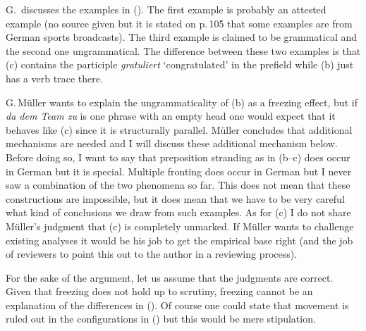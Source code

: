 \begin{exe}
\begin{xlist}
G.\,\citet{GMueller2018a} discusses the examples in (). The first example is probably an
attested example (no source given but it is stated on p.\,105 that some examples are from German sports
broadcasts). The third example is claimed to be grammatical and the second one ungrammatical. The
difference between these two examples is that (c) contains the participle \emph{gratuliert}
`congratulated' in the prefield while (b) just has a verb trace there.

\eal
{}
\zl
G.\,Müller wants to explain the ungrammaticality of (b) as a freezing effect, but if \emph{da dem
  Team zu} is one phrase with an empty head one would expect that it behaves like (c) since
it is structurally parallel. Müller concludes that additional mechanisms are needed and I will
discuss these additional mechanism below. Before doing so, I want to say that preposition stranding
as in (b--c) does occur in German but it is special. Multiple fronting does occur in German
but I never saw a combination of the two phenomena so far. This does not mean that these
constructions are impossible, but it does mean that we have to be very careful what kind of
conclusions we draw from such examples. As for (c) I do not share Müller's judgment that
(c) is completely unmarked. If Müller wants to challenge existing analyses it would be his
job to get the empirical base right (and the job of reviewers to point this out to the author in a
reviewing process).

For the sake of the argument, let us assume that the judgments are correct. Given that freezing does
not hold up to scrutiny, freezing cannot be an explanation of the differences in (). Of
course one could state that movement is ruled out in the configurations in () but this would
be mere stipulation.



\end{xlist}
\end{exe}

